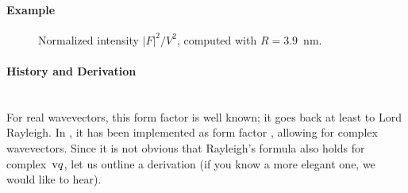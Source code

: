 \paragraph{Example}\nopagebreak\strut\nopagebreak

\begin{figure}[H]
\begin{center}
\end{center}
\caption{Normalized intensity $|F|^2/V^2$,
computed with $R=3.9$~nm.}
\end{figure}

\paragraph{History and Derivation}\strut\\
For real wavevectors, this form factor is well known;
it goes back at least to Lord Rayleigh.
In \IsGISAXS, it has been implemented as form factor 
\cite[Eq.~2.36]{Laz06} \cite[Eq.~226]{ReLL09},
allowing for complex wavevectors.
Since it is not obvious that Rayleigh's formula also holds for complex~$\text{v}{q}$,
let us outline a derivation
(if you know a more elegant one, we would like to hear).

